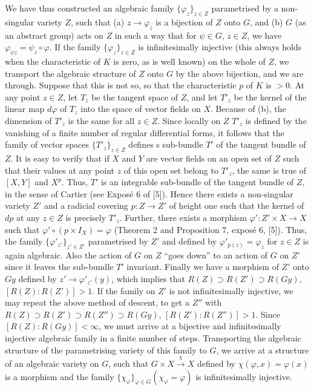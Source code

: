 We have thus constructed an algebraic family $\{\varphi_z\}_{z \in Z}$ parametrised by a non-singular variety $Z$, such that (a) $z \to \varphi_z$ is a bijection of $Z$ onto $G$, and (b) $G$ (as an abstract group) acts on $Z$ in such  a way that for $\psi \in G$, $z \in Z$, we have $\varphi_{\psi z} = \psi_z \circ \varphi$. If the family $\{\varphi_z\}_{z \in Z}$ is infinitesimally injective (this always holds when the characteristic of $K$ is zero, as is well known) on the whole of $Z$, we transport the algebraic structure of $Z$ onto $G$ by the above bijection, and we are through. Suppose that this is not so, so that the characteristic $p$ of $K$ is $> 0$. At any point $z \in Z$, let $T_z$ be the tangent space of $Z$, and let $T'_z$ be the kernel of the linear map $d \varphi$ of $T_z$ into the space of vector fields on $X$. Because of (b), the dimension of $T'_z$ is the same for all $z \in Z$. Since locally on $Z$ $T'_z$ is \pageoriginale defined by the vanishing of a finite number of regular differential forms, it follows that the family of vector spaces $\{T'_z\}_{z \in Z}$ defines s sub-bundle $T'$ of the tangent bundle of $Z$. It is easy to verify that if $X$ and $Y$ are vector fields on an open set of $Z$ such that their values at any point $z$ of this open set belong to $T'_z$, the same is true of $[X, Y]$ and $X^p$. Thus, $T'$ is an integrable sub-bundle of the tangent bundle of $Z$, in the sense of Cartier (see Expos\'e 6 of [5]). Hence there exists a non-singular variety $Z'$ and a radicial covering $p: Z \to Z'$ of height one such that the kernel of $dp$ at any $z \in Z$ is precisely $T'_z$. Further, there exists a morphism $\varphi' : Z' \times X \to X$ such that $\varphi' \circ (p \times I_X) = \varphi$ (Theorem 2 and Proposition 7, expos\'e 6, [5]). Thus, the family $\{\varphi'_{z'}\}_{z' \in Z'}$ parametrised by $Z'$ and defined by $\varphi'_{p(z)} = \varphi_z$ for $z \in Z$ is again algebraic. Also the action of $G$ on $Z$ ``goes down'' to an action of $G$ on $Z'$ since it leaves the sub-bundle $T'$ invariant. Finally we have a morphism of $Z'$ onto $Gy$ defined by $z'\to \varphi'_{z'}(y)$, which implies that $R (Z) \supset R (Z') \supset R (Gy)$, $[R (Z): R (Z')] > 1$. If the family on $Z'$ is not infinitesimally injective, we may repeat the above method of descent, to get  a $Z''$ with $R (Z) \supset R (Z') \supset R (Z'') \supset R (Gy)$, $[R (Z'): R (Z'')] >1$. Since $[R (Z): R (Gy)] < \infty$, we must arrive at a bijective and infinitesimally injective algebraic family in a finite number of steps. Transporting the algebraic structure of the parametrising variety of this family to $G$, we arrive at a structure of an algebraic variety on $G$, such that $G \times X \xrightarrow{\chi} X$ defined by $\chi(\varphi, x) = \varphi (x)$ is a morphism and the family $\{\chi_\varphi\}_{\varphi \in G} (\chi_\varphi = \varphi)$ is infinitesimally injective. 

